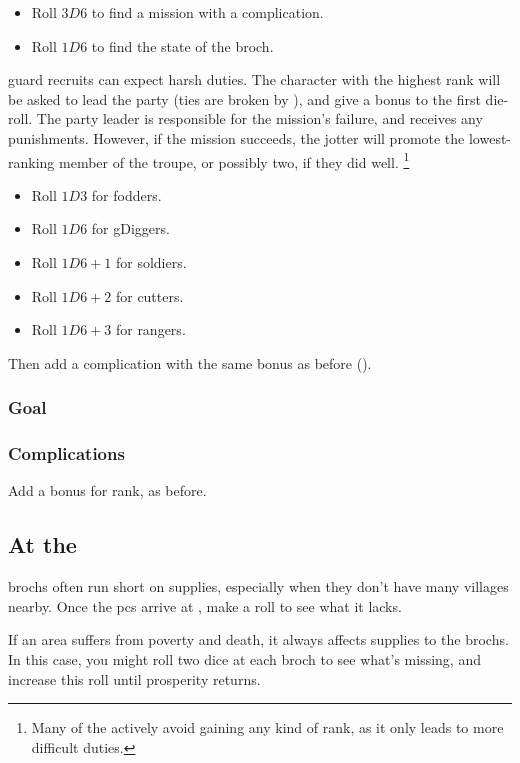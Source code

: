 \begin{multicols}{2}

\begin{itemize}
  \item
  Roll $3D6$ to find a mission with a complication.
  \item
  Roll $1D6$ to find the state of the \gls{broch}.
\end{itemize}

\noindent
\Gls{guard} recruits can expect harsh duties.
The character with the highest rank will be asked to lead the party (ties are broken by ), and give a bonus to the first die-roll.
The party leader is responsible for the mission's failure, and receives any punishments.
However, if the mission succeeds, the jotter will promote the lowest-ranking member of the troupe, or possibly two, if they did well.%
\footnote{Many of the  actively avoid gaining any kind of rank, as it only leads to more difficult duties.}

\begin{itemize}
  \item
  Roll $1D3$ for \glspl{fodder}.
  \item
  Roll $1D6$ for \glspl{gDigger}.
  \item
  Roll $1D6+1$ for \glspl{soldier}.
  \item
  Roll $1D6+2$ for \glspl{cutter}.
  \item
  Roll $1D6+3$ for \glspl{ranger}.
\end{itemize}

Then add a complication with the same bonus as before ().

\subsubsection{Goal}

\ngMissions

\subsubsection{Complications}

Add a bonus for rank, as before.

\missionComplications

\subsection{At the }

\Glspl{broch} often run short on supplies, especially when they don't have many \glspl{village} nearby.
Once the \glspl{pc} arrive at , make a roll to see what it lacks.

\brochDerths

If an area suffers from poverty and death, it always affects supplies to the \glspl{broch}.
In this case, you might roll two dice at each \gls{broch} to see what's missing, and increase this roll until prosperity returns.

\end{multicols}

